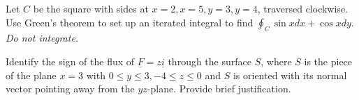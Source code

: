 \documentclass[12pt,letterpaper,noanswers]{exam}
\newcommand{\mb}[1]{\underline{#1}}
\begin{document}
 \pdfpageheight 11in 
  \pdfpagewidth 8.5in



\begin{questions}
\question Let $C$ be the square with sides at $x = 2, x = 5, y = 3, y = 4$, traversed clockwise.  Use Green's theorem to set up an iterated integral to find $\displaystyle\oint_C \sin x dx + \cos x dy$.  \emph{Do not integrate.}

\vfill

\item 
Identify the sign of the flux of $\mb F = z\mb i$ through the surface $S$, where $S$ is the piece of the plane $x = 3$ with $0\leq y \leq 3, -4\leq z\leq 0$ and $S$ is oriented with its normal vector pointing away from the $yz$-plane.  Provide brief justification.

\vfill

\end{questions}
\end{document}
